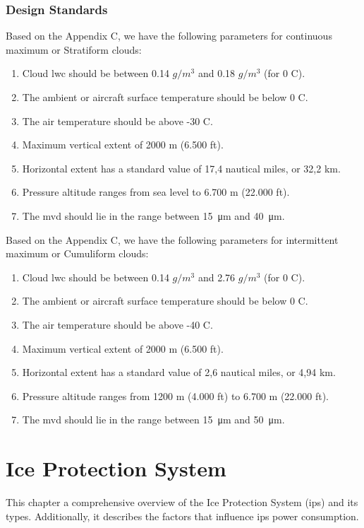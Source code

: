 \documentclass[english]{kththesis}
\begin{document}
\subsection{Design Standards}
\label{subsec:desnstd}
Based on the Appendix C, we have the following parameters for continuous maximum or Stratiform clouds:
\begin{enumerate}
\item Cloud \acrshort{lwc}  should be between 0.14 $g/m^3$ and 0.18 $g/m^3$ (for 0 \degree C).
\item The ambient or aircraft surface temperature should be below 0 \degree C.
\item The air temperature should be above -30 \degree C.
\item Maximum vertical extent of 2000 m (6.500 ft).
\item Horizontal extent has a standard value of 17,4 nautical miles, or 32,2 km.
\item Pressure altitude ranges from sea level to 6.700 m (22.000 ft).
\item The \acrshort{mvd} should lie in the range between \SI{15}{\micro\metre} and \SI{40}{\micro\metre}.
\end{enumerate}

Based on the Appendix C, we have the following parameters for intermittent maximum or Cumuliform clouds:
\begin{enumerate}
\item Cloud \acrshort{lwc}  should be between 0.14 $g/m^3$ and 2.76 $g/m^3$ (for 0 \degree C).
\item The ambient or aircraft surface temperature should be below 0 \degree C.
\item The air temperature should be above -40 \degree C.
\item Maximum vertical extent of 2000 m (6.500 ft).
\item Horizontal extent has a standard value of 2,6 nautical miles, or 4,94 km.
\item Pressure altitude ranges from 1200 m (4.000 ft) to 6.700 m (22.000 ft).
\item The \acrshort{mvd} should lie in the range between \SI{15}{\micro\metre} and \SI{50}{\micro\metre}.
\end{enumerate}
\clearpage

\chapter{Ice Protection System}
\label{ch:IPS}
This chapter a comprehensive overview of the Ice Protection System (\acrshort{ips}) and its types. Additionally, it describes the factors that influence \acrshort{ips} power consumption.
\end{document}
